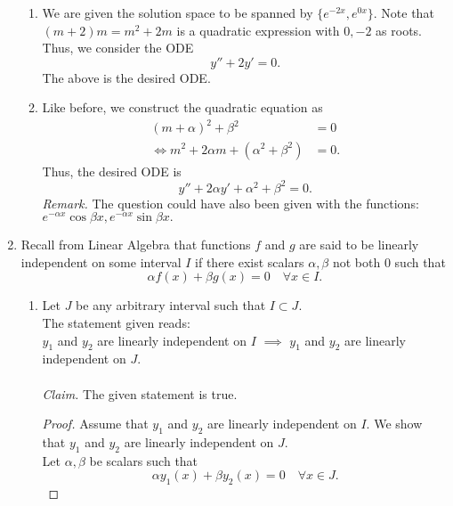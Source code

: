 \documentclass[12pt]{article}
\theoremstyle{definition}
\numberwithin{thm}{section}
\begin{document}
\begin{enumerate}[leftmargin=*, label = Q.\arabic*.]
\begin{enumerate}[label = (\roman*)]
		\item We are given the solution space to be spanned by $\{e^{-2x}, e^{0x}\}.$ Note that $(m + 2)m = m^2 + 2m$ is a quadratic expression with $0, -2$ as roots. Thus, we consider the ODE
		\[y'' + 2y' = 0.\]
		The above is the desired ODE.
		\item Like before, we construct the quadratic equation as
		\begin{align*} 
			(m + \alpha)^2 + \beta^2 &= 0\\
			\iff m^2 + 2\alpha m + (\alpha^2 + \beta^2) &= 0.
		\end{align*}
		Thus, the desired ODE is
		\[y'' + 2\alpha y' + \alpha^2 + \beta^2 = 0.\]
		\emph{Remark.} The question could have also been given with the functions: $e^{-\alpha x}\cos\beta x, e^{-\alpha x}\sin\beta x.$
	\end{enumerate}
	\item Recall from Linear Algebra that functions $f$ and $g$ are said to be linearly independent on some interval $I$ if there exist scalars $\alpha, \beta$ not both $0$ such that
	\[\alpha f(x) + \beta g(x) = 0 \quad \forall x \in I.\]
	\begin{enumerate}[label = (\roman*)] 
		\item Let $J$ be any arbitrary interval such that $I \subset J.$\\
		The statement given reads:\\
		$y_1$ and $y_2$ are linearly independent on $I$ $\implies$ $y_1$ and $y_2$ are linearly independent on $J.$\\\\
		\emph{Claim.} The given statement is true.
		\begin{proof} 
			Assume that $y_1$ and $y_2$ are linearly independent on $I.$ We show that $y_1$ and $y_2$ are linearly independent on $J.$\\
			Let $\alpha, \beta$ be scalars such that
			\begin{equation} \label{eq:linJ}
			\alpha y_1(x) + \beta y_2(x) = 0 \quad \forall x \in J.
			\end{equation}
				

\end{proof}
\end{enumerate}
\end{enumerate}
\end{document}
